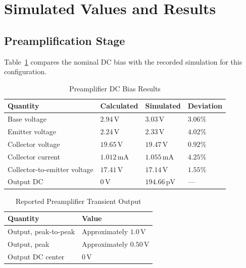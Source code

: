 \documentclass[conference,letterpaper]{IEEEtran}
\newcommand{\V}{\mathrm{V}}
\begin{document}
\section{Simulated Values and Results}
\subsection{Preamplification Stage}
Table~\ref{tab:preamp_sim_dc} compares the nominal DC bias with
the recorded simulation for this configuration.
\begin{table}[H]
\caption{Preamplifier DC Bias Results}
\label{tab:preamp_sim_dc}
\centering\footnotesize
\setlength{\tabcolsep}{2pt}
\begin{tabular}{@{}p{}p{}p{}p{}@{}}
\toprule
Quantity & Calculated & Simulated & Deviation\\
\midrule
Base voltage & $2.94\,\V$ & $3.03\,\V$ & $3.06\%$\\
Emitter voltage & $2.24\,\V$ & $2.33\,\V$ & $4.02\%$\\
Collector voltage & $19.65\,\V$ & $19.47\,\V$ & $0.92\%$\\
Collector current & $1.012\,\mathrm{mA}$ & $1.055\,\mathrm{mA}$ & $4.25\%$\\
Collector-to-emitter voltage & $17.41\,\V$ & $17.14\,\V$ & $1.55\%$\\
Output DC & $0\,\V$ & $194.66\,\mathrm{pV}$ & ---\\
\bottomrule
\end{tabular}
\end{table}
\FloatBarrier
\begin{table}[H]
\caption{Reported Preamplifier Transient Output}
\label{tab:preamp_transient}
\centering\footnotesize
\setlength{\tabcolsep}{2pt}
\begin{tabular}{@{}p{}p{}@{}}
\toprule
Quantity & Value\\
\midrule
Output, peak-to-peak & Approximately $1.0\,\V$\\
Output, peak & Approximately $0.50\,\V$\\
Output DC center & $0\,\V$\\
\bottomrule
\end{tabular}
\end{table}
\FloatBarrier
\end{document}

